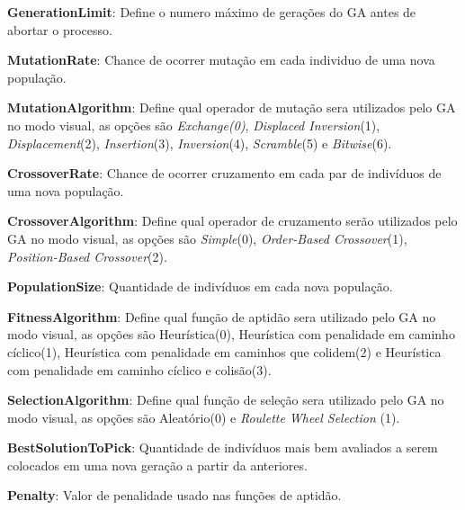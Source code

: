  
 \textbf{GenerationLimit}: Define o numero máximo de gerações do GA antes de abortar o processo.
 
 \textbf{MutationRate}: Chance de ocorrer mutação em cada individuo de uma nova população.
 
 \textbf{MutationAlgorithm}:  Define qual operador de mutação sera utilizados pelo GA no modo visual, as opções são  \textit{Exchange(0)}, \textit{Displaced Inversion}(1), \textit{Displacement}(2), \textit{Insertion}(3), \textit{Inversion}(4), \textit{Scramble}(5) e \textit{Bitwise}(6).
 
 \textbf{CrossoverRate}: Chance de ocorrer cruzamento em cada par de indivíduos de uma nova população.
 
 \textbf{CrossoverAlgorithm}: Define qual operador de cruzamento serão utilizados pelo GA no modo visual, as opções são  \textit{Simple}(0), \textit{Order-Based Crossover}(1), \textit{Position-Based Crossover}(2).
 
 \textbf{PopulationSize}: Quantidade de indivíduos em cada nova população.
 
 \textbf{FitnessAlgorithm}: Define qual função de aptidão sera utilizado pelo GA no modo visual, as opções são Heurística(0), Heurística com penalidade em caminho cíclico(1), Heurística com penalidade em caminhos que colidem(2) e Heurística com penalidade em caminho cíclico e colisão(3).
 
 \textbf{SelectionAlgorithm}: Define qual função de seleção sera utilizado pelo GA no modo visual, as opções são  Aleatório(0) e \textit{Roulette Wheel Selection} (1).
 
 \textbf{BestSolutionToPick}: Quantidade de indivíduos mais bem avaliados a serem colocados em uma nova geração a partir da anteriores.
 
 \textbf{Penalty}: Valor de penalidade usado nas funções de aptidão.
 